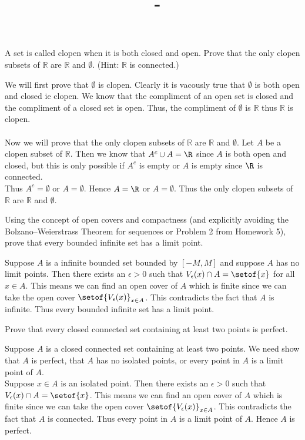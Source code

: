 \documentclass[answers,12pt,addpoints]{exam}
\author{\name}
\title{\course \ - \assignment}
\begin{document}
\maketitle

\begin{questions}
\question A set is called clopen when it is both closed and open. Prove that the only clopen subsets of $\mathbb{R}$ are $\mathbb{R}$ and $\emptyset$. (Hint: $\mathbb{R}$ is connected.)
\begin{solution}
    We will first prove that $\emptyset$ is clopen. Clearly it is vacously true that $\emptyset$ is both open and closed ie clopen. We know that the compliment of an open set is closed and the compliment of a closed set is open. Thus, the compliment of $\emptyset$ is $\mathbb{R}$ thus $\mathbb{R}$ is clopen. \\\\
    Now we will prove that the only clopen subsets of $\mathbb{R}$ are $\mathbb{R}$ and $\emptyset$. Let $A$ be a clopen subset of $\mathbb{R}$. Then we know that $A^c \cup A = \R$ since $A$ is both open and closed, but this is only possible if $A^c$ is empty or $A$ is empty since $\R$ is connected. \\
    Thus $A^c = \emptyset$ or $A = \emptyset$. Hence $A = \R$ or $A = \emptyset$. Thus the only clopen subsets of $\mathbb{R}$ are $\mathbb{R}$ and $\emptyset$.
\end{solution}

\question Using the concept of open covers and compactness (and explicitly avoiding the Bolzano–Weierstrass Theorem for sequences or Problem 2 from Homework 5), prove that every bounded infinite set has a limit point.
\begin{solution}
    Suppose $A$ is a infinite bounded set bounded by $[-M,M]$ and suppose $A$ has no limit points. Then there exists an $\epsilon >0$ such that $V_\epsilon(x) \cap A = \setof{x}$ for all $x \in A$. This means we can find an open cover of $A$ which is finite since we can take the open cover $\setof{V_\epsilon(x)}_{x \in A}$. This contradicts the fact that $A$ is infinite. Thus every bounded infinite set has a limit point. 
\end{solution}

\question Prove that every closed connected set containing at least two points is perfect.
\begin{solution}
    Suppose $A$ is a closed connected set containing at least two points. We need show that $A$ is perfect, that $A$ has no isolated points, or every point in $A$ is a limit point of $A$. \\
    Suppose $x \in A$ is an isolated point. Then there exists an $\epsilon > 0$ such that $V_\epsilon(x) \cap A = \setof{x}$. This means we can find an open cover of $A$ which is finite since we can take the open cover $\setof{V_\epsilon(x)}_{x \in A}$. This contradicts the fact that $A$ is connected. Thus every point in $A$ is a limit point of $A$. Hence $A$ is perfect.
\end{solution}


\end{questions}
\end{document}
